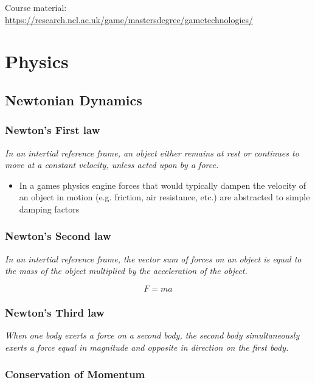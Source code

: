 \documentclass[a4paper]{article}
\begin{document}
\tableofcontents

\vfill
Course material:
\url{https://research.ncl.ac.uk/game/mastersdegree/gametechnologies/}

\section{Physics}

\subsection{Newtonian Dynamics}

\subsubsection{Newton's First law}

\textit{In an intertial reference frame, an object either remains at rest or
continues to move at a constant velocity, unless acted upon by a force.}

\begin{itemize}
  \item
    In a games physics engine forces that would typically dampen the velocity of
    an object in motion (e.g. friction, air resistance, etc.) are abstracted to
    simple damping factors
\end{itemize}

\subsubsection{Newton's Second law}

\textit{In an intertial reference frame, the vector sum of forces on an object
  is equal to the mass of the object multiplied by the acceleration of the
object.}

\[
  F = ma
\]

\subsubsection{Newton's Third law}

\textit{When one body exerts a force on a second body, the second body
  simultaneously exerts a force equal in magnitude and opposite in
direction on the first body.}

\subsubsection{Conservation of Momentum}
\end{document}
